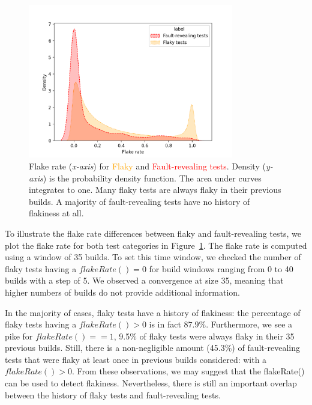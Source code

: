 \begin{figure}[ht]
  \centering
    \includegraphics[width=0.8\textwidth]{figures/chromium/densityFlakeRate.png}
    \caption{Flake rate (\textit{x-axis}) for \textcolor{orange}{Flaky} and \textcolor{red}{Fault-revealing tests}. Density (\textit{y-axis}) is the probability density function. The area under curves integrates to one. Many flaky tests are always flaky in their previous builds. A majority of fault-revealing tests have no history of flakiness at all.}
    \label{fig:kdeRates}
\end{figure}

To illustrate the flake rate differences between flaky and fault-revealing tests, we plot the flake rate for both test categories in Figure~\ref{fig:kdeRates}. The flake rate is computed using a window of 35 builds. To set this time window, we checked the number of flaky tests having a $flakeRate() = 0$ for build windows ranging from 0 to 40 builds with a step of 5. We observed a convergence at size 35, meaning that higher numbers of builds do not provide additional information.

In the majority of cases, flaky tests have a history of flakiness: the percentage of flaky tests having a $flakeRate() > 0$ is in fact $87.9\%$. Furthermore, we see a pike for $flakeRate() == 1$, 9.5\% of flaky tests were always flaky in their 35 previous builds. 
Still, there is a non-negligible amount (45.3\%) of fault-revealing tests that were flaky at least once in previous builds considered: with a $flakeRate() > 0$.
From these observations, we may suggest that the \textsf{flakeRate()} can be used to detect flakiness.
Nevertheless, there is still an important overlap between the history of flaky tests and fault-revealing tests. 

